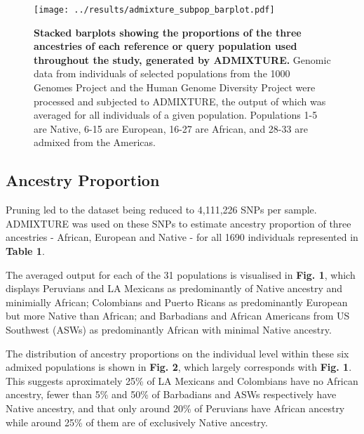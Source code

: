 \documentclass[11pt]{article}
\begin{document}
\begin{figure}[htb!]%
    \centering
    \texttt{[image: 
        ../results/admixture\_subpop\_barplot.pdf]} 
    \vspace{-0.2cm}
    \caption{\textbf{
        Stacked barplots showing the proportions of the three ancestries of each reference or query population used throughout the study, generated by ADMIXTURE.
    }
        Genomic data from individuals of selected populations from the 1000 Genomes Project and the Human Genome Diversity Project were processed and subjected to ADMIXTURE, the output of which was averaged for all individuals of a given population. Populations 1-5 are Native, 6-15 are European, 16-27 are African, and 28-33 are admixed from the Americas.
    }
\end{figure}

\subsection{Ancestry Proportion}

Pruning led to the dataset being reduced to 4,111,226 SNPs per sample. ADMIXTURE was used on these SNPs to estimate ancestry proportion of three ancestries - African, European and Native - for all 1690 individuals represented in \textbf{Table 1}.

The averaged output for each of the 31 populations is visualised in \textbf{Fig. 1}, which displays Peruvians and LA Mexicans as predominantly of Native ancestry and minimially African; Colombians and Puerto Ricans as predominantly European but more Native than African; and Barbadians and African Americans from US Southwest (ASWs) as predominantly African with minimal Native ancestry.

The distribution of ancestry proportions on the individual level within these six admixed populations is shown in \textbf{Fig. 2}, which largely corresponds with \textbf{Fig. 1}. This suggests aproximately 25\% of LA Mexicans and Colombians have no African ancestry, fewer than 5\% and 50\% of Barbadians and ASWs respectively have Native ancestry, and that only around 20\% of Peruvians have African ancestry while around 25\% of them are of exclusively Native ancestry.
\end{document}
